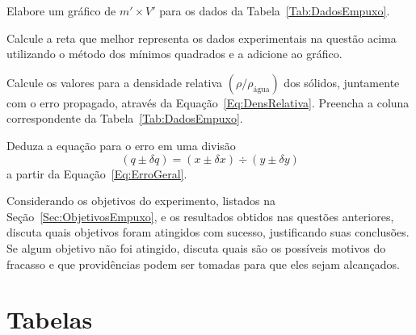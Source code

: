 \begin{question}[type={exam}]{1}
Elabore um gráfico de $m' \times V'$ para os dados da Tabela~\ref{Tab:DadosEmpuxo}.
\end{question}

\begin{question}[type={exam}]{1.5}
Calcule a reta que melhor representa os dados experimentais na questão acima utilizando o método dos mínimos quadrados e a adicione ao gráfico.
\end{question}

\begin{question}[type={exam}]{1.5}
Calcule os valores para a densidade relativa $(\rho/\rho_{\textrm{água}})$ dos sólidos, juntamente com o erro propagado, através da Equação~\ref{Eq:DensRelativa}. Preencha a coluna correspondente da Tabela~\ref{Tab:DadosEmpuxo}. 
\end{question}

\begin{question}[type={exam}]{1.5}
Deduza a equação para o erro em uma divisão
\begin{equation}
    (q \pm \delta q) = (x \pm \delta x) \div (y \pm \delta y)
\end{equation}
%
a partir da Equação~\eqref{Eq:ErroGeral}.
\end{question}

\begin{question}[type={exam}]{1.5}
Considerando os objetivos do experimento, listados na Seção~\ref{Sec:ObjetivosEmpuxo}, e os resultados obtidos nas questões anteriores, discuta quais objetivos foram atingidos com sucesso, justificando suas conclusões. Se algum objetivo não foi atingido, discuta quais são os possíveis motivos do fracasso e que providências podem ser tomadas para que eles sejam alcançados.
\end{question}

\vfill
\pagebreak
\section{Tabelas}

